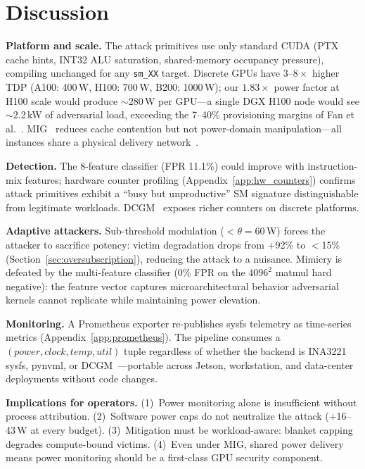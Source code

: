 \documentclass[letterpaper,twocolumn,10pt]{article}
\begin{document}
\section{Discussion}
\label{sec:discussion}

\textbf{Platform and scale.}
The attack primitives use only standard CUDA (PTX cache hints, INT32
ALU saturation, shared-memory occupancy pressure), compiling unchanged
for any \texttt{sm\_XX} target.  Discrete GPUs have
$3\text{--}8\times$ higher TDP (A100: 400\,W, H100: 700\,W,
B200: 1000\,W); our $1.83\times$ power factor at H100 scale would
produce $\sim$280\,W per GPU---a single DGX H100 node would see
$\sim$2.2\,kW of adversarial load, exceeding the 7--40\%
provisioning margins of Fan et al.~\cite{fan2007}.
MIG~\cite{nvidia_mig2024} reduces cache contention but not
power-domain manipulation---all instances share a physical delivery
network~\cite{zhang2023tunnels,miao2024,gu2026}.

\textbf{Detection.}
The 8-feature classifier (FPR 11.1\%) could improve with
instruction-mix features; hardware counter profiling
(Appendix~\ref{app:hw_counters}) confirms attack primitives
exhibit a ``busy but unproductive'' SM signature distinguishable
from legitimate workloads.  DCGM~\cite{dcgm2026} exposes richer
counters on discrete platforms.

\textbf{Adaptive attackers.}
Sub-threshold modulation ($<\theta{=}60$\,W) forces the attacker to
sacrifice potency: victim degradation drops from $+$92\% to
$<$15\% (Section~\ref{sec:oversubscription}), reducing the attack
to a nuisance.  Mimicry is defeated by the multi-feature classifier
(0\% FPR on the $4096^2$ matmul hard negative): the feature vector
captures microarchitectural behavior adversarial kernels cannot
replicate while maintaining power elevation.

\textbf{Monitoring.}
A Prometheus exporter re-publishes sysfs telemetry as time-series
metrics (Appendix~\ref{app:prometheus}).
The pipeline consumes a $(power, clock, temp, util)$ tuple
regardless of whether the backend is INA3221 sysfs, pynvml, or
DCGM~\cite{dcgm2026}---portable across Jetson, workstation, and
data-center deployments without code changes.

\textbf{Implications for operators.}
(1)~Power monitoring alone is insufficient without process attribution.
(2)~Software power caps do not neutralize the attack ($+$16--43\,W at
every budget).
(3)~Mitigation must be workload-aware: blanket capping degrades
compute-bound victims.
(4)~Even under MIG, shared power delivery means power monitoring
should be a first-class GPU security component.
\end{document}
